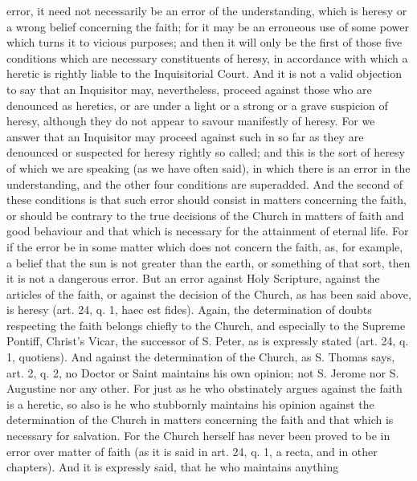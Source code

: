        error, it need not necessarily be an error of the understanding, which is heresy or a wrong
       belief concerning the faith; for it may be an erroneous use of some power which turns it to
       vicious purposes; and then it will only be the first of those five conditions which are
       necessary constituents of heresy, in accordance with which a heretic is rightly liable to the
       Inquisitorial Court.
             And it is not a valid objection to say that an Inquisitor may, nevertheless, proceed
       against those who are denounced as heretics, or are under a light or a strong or a grave
       suspicion of heresy, although they do not appear to savour manifestly of heresy. For we
       answer that an Inquisitor may proceed against such in so far as they are denounced or
       suspected for heresy rightly so called; and this is the sort of heresy of which we are speaking
       (as we have often said), in which there is an error in the understanding, and the other four
       conditions are superadded. And the second of these conditions is that such error should
       consist in matters concerning the faith, or should be contrary to the true decisions of the
       Church in matters of faith and good behaviour and that which is necessary for the attainment
       of eternal life. For if the error be in some matter which does not concern the faith, as, for
       example, a belief that the sun is not greater than the earth, or something of that sort, then it
       is not a dangerous error. But an error against Holy Scripture, against the articles of the faith,
       or against the decision of the Church, as has been said above, is heresy (art. 24, q. 1, haec
       est fides).
             Again, the determination of doubts respecting the faith belongs chiefly to the Church,
       and especially to the Supreme Pontiff, Christ's Vicar, the successor of S. Peter, as is
       expressly stated (art. 24, q. 1, quotiens). And against the determination of the Church, as S.
       Thomas says, art. 2, q. 2, no Doctor or Saint maintains his own opinion; not S. Jerome nor S.
       Augustine nor any other. For just as he who obstinately argues against the faith is a heretic,
       so also is he who stubbornly maintains his opinion against the determination of the Church
       in matters concerning the faith and that which is necessary for salvation. For the Church
       herself has never been proved to be in error over matter of faith (as it is said in art. 24, q. 1,
       a recta, and in other chapters). And it is expressly said, that he who maintains anything
